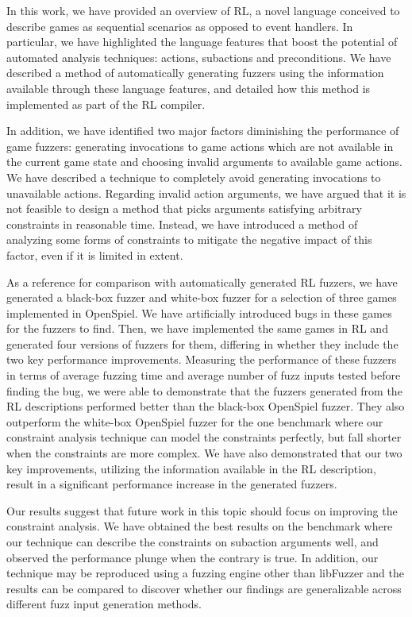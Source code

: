 In this work, we have provided an overview of RL, a novel language conceived to describe games as sequential scenarios as opposed to event handlers.
In particular, we have highlighted the language features that boost the potential of automated analysis techniques: actions, subactions and preconditions.
We have described a method of automatically generating fuzzers using the information available through these language features, and detailed how this method is implemented as part of the RL compiler.

In addition, we have identified two major factors diminishing the performance of game fuzzers: generating invocations to game actions which are not available in the current game state and 
    choosing invalid arguments to available game actions.
We have described a technique to completely avoid generating invocations to unavailable actions.
Regarding invalid action arguments, we have argued that it is not feasible to design a method that picks arguments satisfying arbitrary constraints in reasonable time.
Instead, we have introduced a method of analyzing some forms of constraints to mitigate the negative impact of this factor, even if it is limited in extent.

As a reference for comparison with automatically generated RL fuzzers, we have generated a black-box fuzzer and white-box fuzzer for a selection of three games implemented in OpenSpiel.
We have artificially introduced bugs in these games for the fuzzers to find.
Then, we have implemented the same games in RL and generated four versions of fuzzers for them, differing in whether they include the two key performance improvements.
Measuring the performance of these fuzzers in terms of average fuzzing time and average number of fuzz inputs tested before finding the bug, we were able to demonstrate that the fuzzers generated from the RL descriptions performed better than the black-box OpenSpiel fuzzer.
They also outperform the white-box OpenSpiel fuzzer for the one benchmark where our constraint analysis technique can model the constraints perfectly, but fall shorter when the constraints are more complex.
We have also demonstrated that our two key improvements, utilizing the information available in the RL description, result in a significant performance increase in the generated fuzzers.

Our results suggest that future work in this topic should focus on improving the constraint analysis.
We have obtained the best results on the benchmark where our technique can describe the constraints on subaction arguments well, and observed the performance plunge when the contrary is true.
In addition, our technique may be reproduced using a fuzzing engine other than libFuzzer and the results can be compared to discover whether our findings are generalizable across different fuzz input generation methods.

